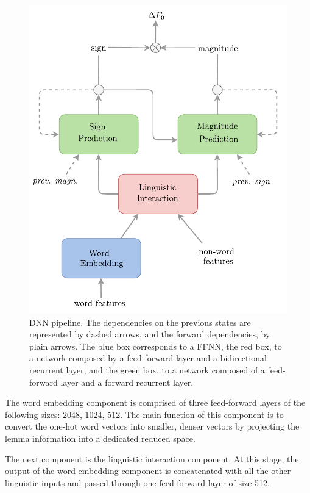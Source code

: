 \begin{figure}[H]
    \centering
    \includegraphics[scale=0.75]{figures/dnn-pipeline.pdf}
    \vspace*{5mm}
    \caption[Intonation model pipeline]{\ac{DNN} pipeline. 
      The dependencies on the previous states are represented by dashed arrows, and the forward dependencies, by plain arrows.
      The blue box corresponds to a \acs{FFNN},
      the red box, to a network composed by a feed-forward layer and a bidirectional recurrent layer, and
      the green box, to a network composed of a feed-forward layer and a forward recurrent layer.}
    \label{fig:dnn-pipeline}
\end{figure}


The word embedding \citep{Levy2014Neural} component is comprised of three  feed-forward layers of the following sizes: 2048, 1024, 512.
The main function of this component is to convert the one-hot word vectors into smaller, denser vectors by projecting the lemma information into a dedicated reduced space.

The next component is the linguistic interaction component.
At this stage, the output of the word embedding component is concatenated with all the other linguistic inputs and passed through one feed-forward layer of size 512.

